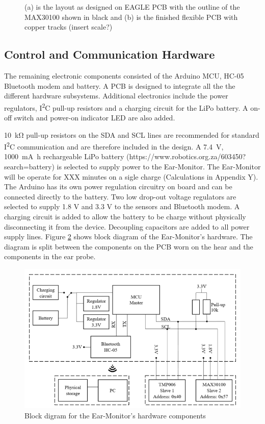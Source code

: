 \begin{figure}[H]
\centering
\graphicspath{{figs/}}
\def\svgwidth{180pt}

\caption{(a) is the layout as designed on EAGLE PCB  with the outline of the MAX30100 shown in black and (b) is the finished flexible PCB with copper tracks (insert scale?)}
\label{fig:MAX30100_layout}
\end{figure}

\subsection{Control and Communication Hardware}
The remaining electronic components consisted of the Arduino MCU, HC-05 Bluetooth modem and battery. A PCB is designed to integrate all the the different hardware subsystems. Additional electronics include the power regulators, I\textsuperscript{2}C pull-up resistors and a charging circuit for the LiPo battery. A on-off switch and power-on indicator LED are also added. 

\medskip

\SI{10}{\kilo\ohm} pull-up resistors on the SDA and SCL lines are recommended for standard I\textsuperscript{2}C communication and are therefore included in the design. A \SI{7.4}{\volt}, \SI{1000}{\milli\ampere\hour} rechargeable LiPo battery (https://www.robotics.org.za/603450?search=battery) is selected to supply power to the Ear-Monitor. The Ear-Monitor will be operate for XXX minutes on a sigle charge (Calculations in Appendix Y). The Arduino has its own power regulation circuitry on board and can be connected directly to the battery. Two low drop-out voltage regulators are selected to supply 1.8 V and 3.3 V to the sensors and Bluetooth modem. A charging circuit is added to allow the battery to be charge without physically disconnecting it from the device. Decoupling capacitors are added to all power supply lines. Figure \ref{fig:Ear-Monitor_BlockDiagram} shows block diagram of the Ear-Monitor's hardware. The diagram is split between the components on the PCB worn on the hear and the components in the ear probe.

\begin{figure}[H]
   \centering
   \includegraphics[scale=0.9]{figs/Ear-Monitor_BlockDiagram.png}
   \caption{Block digram for the Ear-Monitor's hardware components}
   \label{fig:Ear-Monitor_BlockDiagram}
\end{figure}


